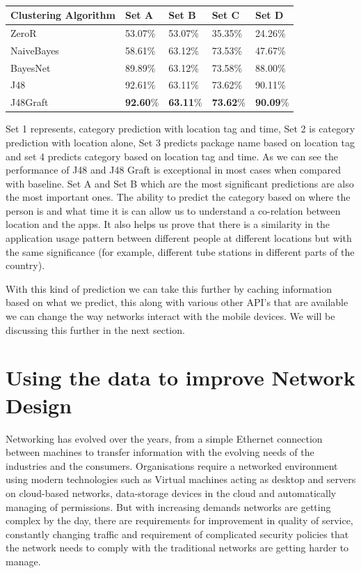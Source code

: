 \documentclass[prodmode,acmtecs]{acmsmall}
\begin{document}
\begin{table}[htdp]
\begin{tabularx}{\textwidth}{|X|l|l|l|l|}
\hline
\textbf{Clustering Algorithm}      &\textbf{Set A}      & \textbf{Set B}      & \textbf{Set C}     & \textbf{Set D}      \\ \hline
ZeroR & 53.07\% & 53.07\% & 35.35\% & 24.26\% \\
NaiveBayes & 58.61\% & 63.12\% & 73.53\% & 47.67\% \\
BayesNet & 89.89\%	& 63.12\% &	73.58\%	& 88.00\% \\
J48 & 92.61\%	& 63.11\% &	73.62\%	& 90.11\% \\
J48Graft & \textbf{92.60}\%	& \textbf{63.11}\% & \textbf{73.62}\%	& \textbf{90.09}\% \\ \hline
\end{tabularx}
\caption{}
\label{TBL:fsqprediction}
\end{table}

Set 1 represents, category prediction with location tag and time, Set 2 is category prediction with location alone, Set 3 predicts package name based on location tag and set 4 predicts category based on location tag and time. As we can see the performance of J48 and J48 Graft is exceptional in most cases when compared with baseline. Set A and Set B which are the most significant predictions are also the most important ones. The ability to predict the category based on where the person is and what time it is can allow us to understand a co-relation between location and the apps. It also helps us prove that there is a similarity in the application usage pattern between different people at different locations but with the same significance (for example, different tube stations in different parts of the country).

With this kind of prediction we can take this further by caching information based on what we predict, this along with various other API's that are available we can change the way networks interact with the mobile devices. We will be discussing this further in the next section.


\section{Using the data to improve Network Design}
\label{networkdesign}

Networking has evolved over the years, from a simple Ethernet connection between machines to transfer information with the evolving needs of the industries and the consumers. Organisations require a networked environment using modern technologies such as Virtual machines acting as desktop and servers on cloud-based networks, data-storage devices in the cloud and automatically managing of permissions. But with increasing demands networks are getting complex by the day, there are requirements for improvement in quality of service, constantly changing traffic and requirement of complicated security policies that the network needs to comply with the traditional networks are getting harder to manage. 
\end{document}
